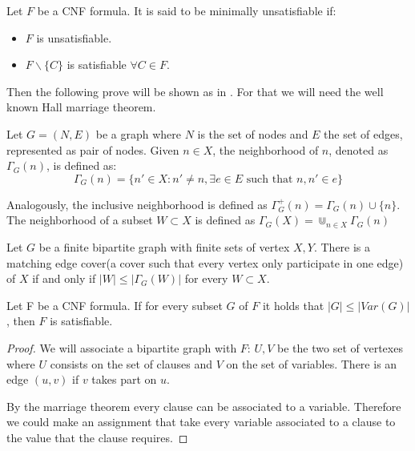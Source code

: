 


\begin{definition}
Let $F$ be a CNF formula. It is said to be minimally unsatisfiable if:
\begin{itemize}
	\item $F$ is unsatisfiable.
	\item $F\backslash \{C\}$ is satisfiable $\forall C \in F$.
\end{itemize}
\end{definition}


Then the following prove will be shown as in \cite{schoning2013satisfiability}. For that we will need the well known Hall marriage theorem\cite{hall2009representatives}.

\begin{definition}
  Let $G=(N,E)$ be a graph where $N$ is the set of nodes and $E$ the set of edges, represented as pair of nodes. Given $n \in X$,  the neighborhood of $n$, denoted as $\Gamma_G(n)$, is defined as:
	$$ \Gamma_G(n) = \{ n' \in X : n'\ne n, \exists e \in E \text{ such that } n,n' \in e\}$$
	
        Analogously, the inclusive neighborhood is defined as $\Gamma_G^+(n) = \Gamma_G(n) \cup \{n\}$. The neighborhood of a subset $W \subset X$ is defined as $\Gamma_G(X) = \Cup_{n\in X} \Gamma_G(n)$
\end{definition}


\begin{theorem}
  Let $G$ be a finite bipartite graph with finite sets of vertex $X,Y$. There is a matching edge cover(a cover such that every vertex only participate in one edge) of $X$ if and only if $|W| \le |\Gamma_G(W)|$ for every $W\subset X$.  
\end{theorem}


\begin{lemma}
Let F be a CNF formula. If for every subset $G$ of $F$ it holds that $|G|\le |Var(G)|$, then $F$ is satisfiable.
\end{lemma}

\begin{proof}
  We will associate a bipartite graph with $F$:  $U, V$ be the two set of vertexes where $U$ consists on the set of clauses and $V$ on the set of variables. There is an edge $(u,v)$ if $v$ takes part on $u$.

  By the marriage theorem every clause can be associated to a variable. Therefore we could make an assignment that take every variable associated to a clause to the value that the clause requires.
\end{proof}


